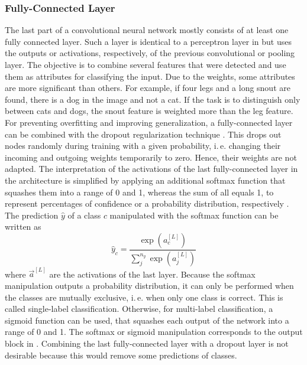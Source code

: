 \subsubsection{Fully-Connected Layer}
\label{sec:cnn-fully-connected}
The last part of a convolutional neural network mostly consists of at least one fully connected layer.
Such a layer is identical to a perceptron layer in  but uses the outputs or activations, respectively, of the previous convolutional or pooling layer.
The objective is to combine several features that were detected and use them as attributes for classifying the input.
Due to the weights, some attributes are more significant than others.
For example, if four legs and a long snout are found, there is a dog in the image and not a cat.
If the task is to distinguish only between cats and dogs, the snout feature is weighted more than the leg feature.
For preventing overfitting and improving generalization, a fully-connected layer can be combined with the dropout regularization technique \cite{Srivastava:2014:DSW:2627435.2670313}.
This drops out nodes randomly during training with a given probability, i.\,e. changing their incoming and outgoing weights temporarily to zero.
Hence, their weights are not adapted.
The interpretation of the activations of the last fully-connected layer in the architecture is simplified by applying an additional softmax function that squashes them into a range of 0 and 1, whereas the sum of all equals 1, to represent percentages of confidence or a probability distribution, respectively \cite{Bishop2006}.
The prediction $\hat{y}$ of a class $c$ manipulated with the softmax function can be written as
\begin{equation}
	\label{eq:softmax}
	\hat{y}_c = \frac{\exp(a^{[L]}_c)}{\sum_{j}^{n_y} \exp(a^{[L]}_j)}
\end{equation}
where $\vec{a}^{[L]}$ are the activations of the last layer.
Because the softmax manipulation outputs a probability distribution, it can only be performed when the classes are mutually exclusive, i.\,e. when only one class is correct.
This is called single-label classification.
Otherwise, for multi-label classification, a sigmoid function can be used, that squashes each output of the network into a range of 0 and 1.
The softmax or sigmoid manipulation corresponds to the output block in .
Combining the last fully-connected layer with a dropout layer is not desirable because this would remove some predictions of classes.